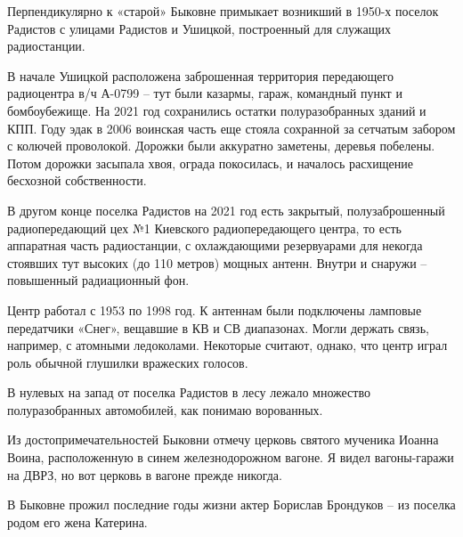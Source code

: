 Перпендикулярно к «старой» Быковне примыкает возникший в 1950-х поселок Радистов с улицами Радистов и Ушицкой, построенный для служащих радиостанции. 

В начале Ушицкой расположена заброшенная территория передающего радиоцентра в/ч А-0799 – тут были казармы, гараж, командный пункт и бомбоубежище. На 2021 год сохранились остатки полуразобранных зданий и КПП. Году эдак в 2006 воинская часть еще стояла сохранной за сетчатым забором с колючей проволокой. Дорожки были аккуратно заметены, деревья побелены. Потом дорожки засыпала хвоя, ограда покосилась, и началось расхищение бесхозной собственности.

В другом конце поселка Радистов на 2021 год есть закрытый, полузаброшенный радиопередающий цех №1 Киевского радиопередающего центра, то есть аппаратная часть радиостанции, с охлаждающими резервуарами для некогда стоявших тут высоких (до 110 метров) мощных антенн. Внутри и снаружи – повышенный радиационный фон.

Центр работал с 1953 по 1998 год. К антеннам были подключены ламповые передатчики «Снег», вещавшие в КВ и СВ диапазонах. Могли держать связь, например, с атомными ледоколами. Некоторые считают, однако, что центр играл роль обычной глушилки вражеских голосов.

В нулевых на запад от поселка Радистов в лесу лежало множество полуразобранных автомобилей, как понимаю ворованных.

Из достопримечательностей Быковни отмечу церковь святого мученика Иоанна Воина, расположенную в синем железнодорожном вагоне. Я видел вагоны-гаражи на ДВРЗ, но вот церковь в вагоне прежде никогда.

В Быковне прожил последние годы жизни актер Борислав Брондуков – из поселка родом его жена Катерина.\\
